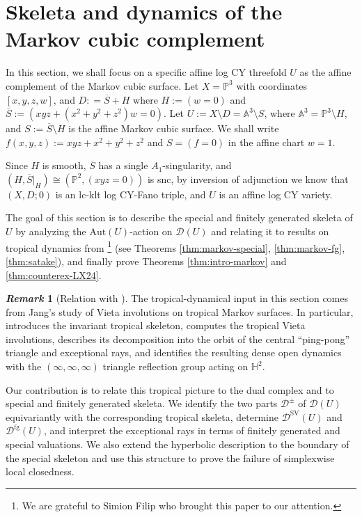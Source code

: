 \documentclass[reqno, 12pt]{amsart}
\theoremstyle{definition}
\newtheorem{rem}[prop]{\it Remark}
\newcommand{\bP}{\mathbb{P}}
\newcommand{\bA}{\mathbb{A}}
\newcommand{\cD}{\mathcal{D}}
\newcommand{\Aut}{\mathrm{Aut}}
\newcommand{\SV}{\mathrm{SV}}
\newcommand{\oS}{\overline{S}}
\newcommand{\bH}{\mathbb{H}}
\newcommand{\rfg}{\mathrm{fg}}
\numberwithin{equation}{section}
\begin{document}
\section{Skeleta and dynamics of the Markov cubic complement}\label{sec:Markov}

In this section, we shall focus on a specific affine log CY threefold $U$ as the affine complement of the Markov cubic surface. Let $X = \bP^3$ with coordinates $[x,y,z,w]$, and $D: = \oS+H$ where $H := (w=0)$ and $\oS := (xyz+(x^2  + y^2 +z^2)w = 0)$. Let $U := X\setminus D = \bA^3 \setminus S$, where $\bA^3=\bP^3\setminus H$, and   $S := \oS\setminus H$ is the affine Markov cubic surface.
We shall write $f(x,y,z):= xyz + x^2 + y^2 + z^2$ and $S=(f=0)$ in the affine chart $w = 1$.

Since $H$ is smooth, $\oS$ has a single $A_1$-singularity, and $(H, \oS|_H)\cong (\bP^2, (xyz=0))$ is snc, by inversion of adjunction we know that $(X, D; 0)$ is an lc-klt log CY-Fano triple, and $U$ is an affine log CY variety.

The goal of this section is to describe the special and finitely generated skeleta of $U$ by analyzing the $\Aut(U)$-action on $\cD(U)$ and relating it to results on tropical dynamics from \cite{Jan23}\footnote{We are grateful to Simion Filip who brought this paper to our attention.} (see Theorems \ref{thm:markov-special}, \ref{thm:markov-fg}, \ref{thm:satake}), and finally prove Theorems \ref{thm:intro-markov} and \ref{thm:counterex-LX24}.

\begin{rem}[Relation with \cite{Jan23}]
The tropical-dynamical input in this section comes from Jang's study of
Vieta involutions on tropical Markov surfaces. In particular,
\cite{Jan23} introduces the invariant tropical skeleton, computes the
tropical Vieta involutions, describes its decomposition into the orbit
of the central ``ping-pong'' triangle and exceptional rays, and identifies
the resulting dense open dynamics with the $(\infty,\infty,\infty)$
triangle reflection group acting on $\bH^2$.

Our contribution is to relate this tropical picture to the dual complex
and to special and finitely generated skeleta. We identify the two parts $\cD^\pm$ of
$\cD(U)$ equivariantly with the corresponding tropical skeleta, determine $\cD^{\SV}(U)$ and $\cD^{\rfg}(U)$, and interpret the exceptional
rays in terms of finitely generated and special valuations. We also extend
the hyperbolic description to the boundary of the special skeleton and
use this structure to prove the failure of simplexwise local closedness.
\end{rem}
\end{document}
